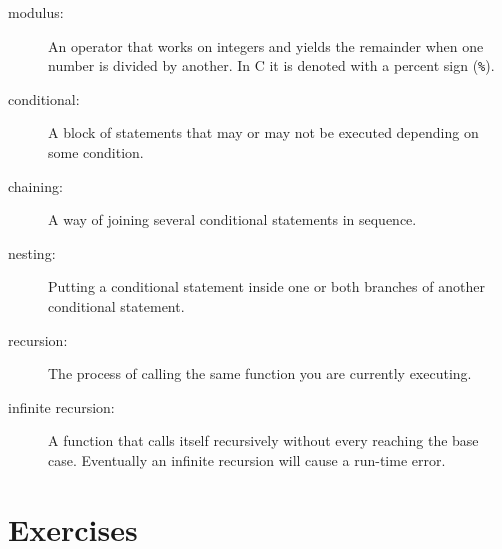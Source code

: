 \begin{description}

\item[modulus:]  An operator that works on integers and yields
the remainder when one number is divided by another.  In C
it is denoted with a percent sign ({\tt \%}).

\item[conditional:]  A block of statements that may or may not
be executed depending on some condition.

\item[chaining:]  A way of joining several conditional statements
in sequence.

\item[nesting:] Putting a conditional statement inside one or both
branches of another conditional statement.

\item[recursion:]  The process of calling the same function you
are currently executing.

\item[infinite recursion:]  A function that calls itself
recursively without every reaching the base case.  Eventually
an infinite recursion will cause a run-time error.


\end{description}


\section{Exercises}
\setcounter{exercisenum}{0}





